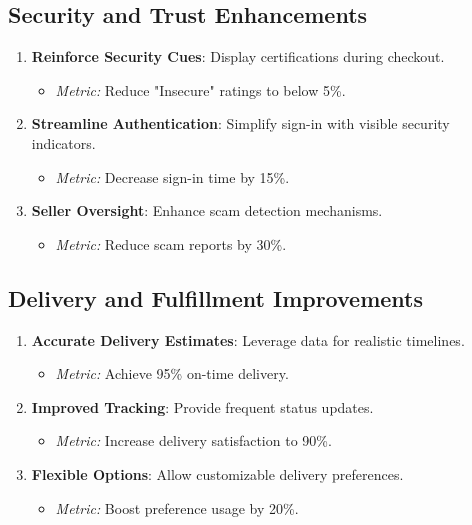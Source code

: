 \documentclass[conference]{IEEEtran}
\begin{document}
\subsection{Security and Trust Enhancements}
\begin{enumerate}
    \item \textbf{Reinforce Security Cues}: Display certifications during checkout.
    \begin{itemize}
        \item \textit{Metric:} Reduce "Insecure" ratings to below 5\%.
    \end{itemize}
    \item \textbf{Streamline Authentication}: Simplify sign-in with visible security indicators.
    \begin{itemize}
        \item \textit{Metric:} Decrease sign-in time by 15\%.
    \end{itemize}
    \item \textbf{Seller Oversight}: Enhance scam detection mechanisms.
    \begin{itemize}
        \item \textit{Metric:} Reduce scam reports by 30\%.
    \end{itemize}
\end{enumerate}

\subsection{Delivery and Fulfillment Improvements}
\begin{enumerate}
    \item \textbf{Accurate Delivery Estimates}: Leverage data for realistic timelines.
    \begin{itemize}
        \item \textit{Metric:} Achieve 95\% on-time delivery.
    \end{itemize}
    \item \textbf{Improved Tracking}: Provide frequent status updates.
    \begin{itemize}
        \item \textit{Metric:} Increase delivery satisfaction to 90\%.
    \end{itemize}
    \item \textbf{Flexible Options}: Allow customizable delivery preferences.
    \begin{itemize}
        \item \textit{Metric:} Boost preference usage by 20\%.
    \end{itemize}
\end{enumerate}
\end{document}
